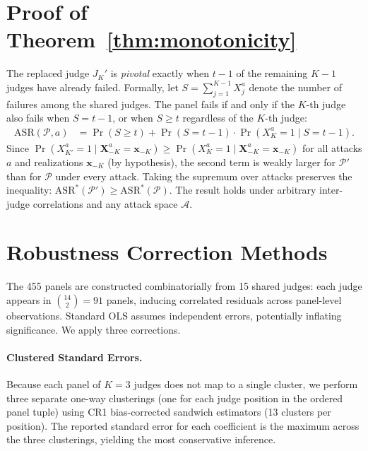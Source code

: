\appendix

\section{Proof of Theorem~\ref{thm:monotonicity}}
\label{app:proof}

The replaced judge $J_K'$ is \emph{pivotal} exactly when $t{-}1$ of the remaining $K{-}1$ judges have already failed. Formally, let $S = \sum_{j=1}^{K-1} X_j^a$ denote the number of failures among the shared judges. The panel fails if and only if the $K$-th judge also fails when $S = t{-}1$, or when $S \geq t$ regardless of the $K$-th judge:
\begin{align}
\mathrm{ASR}(\mathcal{P}, a) &= \Pr(S \geq t) + \Pr(S = t{-}1) \cdot \Pr(X_K^a {=} 1 \mid S = t{-}1).
\end{align}
Since $\Pr(X_{K'}^a {=} 1 \mid \mathbf{X}_{-K}^a {=} \mathbf{x}_{-K}) \geq \Pr(X_K^a {=} 1 \mid \mathbf{X}_{-K}^a {=} \mathbf{x}_{-K})$ for all attacks $a$ and realizations $\mathbf{x}_{-K}$ (by hypothesis), the second term is weakly larger for $\mathcal{P}'$ than for $\mathcal{P}$ under every attack. Taking the supremum over attacks preserves the inequality: $\mathrm{ASR}^*(\mathcal{P}') \geq \mathrm{ASR}^*(\mathcal{P})$. The result holds under arbitrary inter-judge correlations and any attack space $\mathcal{A}$.

\section{Robustness Correction Methods}
\label{app:robustness_methods}

The 455 panels are constructed combinatorially from 15 shared judges: each judge appears in $\binom{14}{2} = 91$ panels, inducing correlated residuals across panel-level observations. Standard OLS assumes independent errors, potentially inflating significance. We apply three corrections.

\paragraph{Clustered Standard Errors.} Because each panel of $K{=}3$ judges does not map to a single cluster, we perform three separate one-way clusterings (one for each judge position in the ordered panel tuple) using CR1 bias-corrected sandwich estimators (13 clusters per position). The reported standard error for each coefficient is the maximum across the three clusterings, yielding the most conservative inference.

